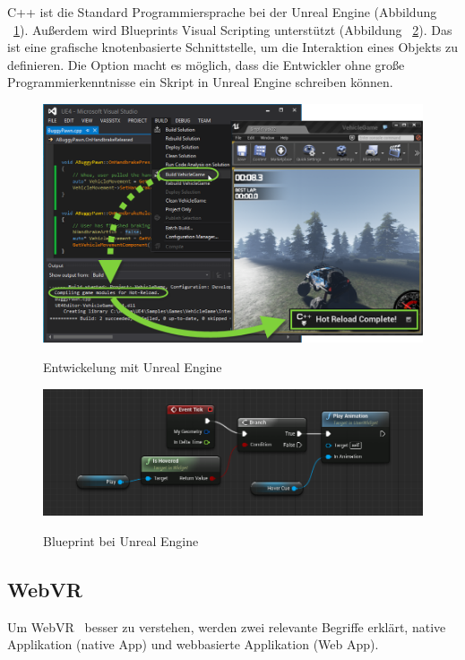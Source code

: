   C++ ist die Standard Programmiersprache bei der Unreal Engine (Abbildung ~\ref{fig:uec}). Außerdem wird Blueprints Visual Scripting unterstützt (Abbildung ~\ref{fig:ueblueprint}). Das ist eine grafische knotenbasierte Schnittstelle, um die Interaktion eines Objekts zu definieren. Die Option macht es möglich, dass die Entwickler ohne große Programmierkenntnisse ein Skript in Unreal Engine schreiben können.

\begin{figure}[ht]
\vspace*{1em}
\centering
\caption{Entwickelung mit Unreal Engine}
\includegraphics[width=\textwidth]{images/uec.png}
\label{fig:uec} 
\end{figure} 
  
\begin{figure}[ht]
\vspace*{1em}
\centering
\caption{Blueprint bei Unreal Engine}
\includegraphics[width=\textwidth]{images/ueblueprint.png}
\label{fig:ueblueprint} 
\end{figure}
  
 \subsection{WebVR}
 Um \glqq WebVR \grqq\ besser zu verstehen, werden zwei relevante Begriffe erklärt, native Applikation (native App) und webbasierte Applikation (Web App).
 
